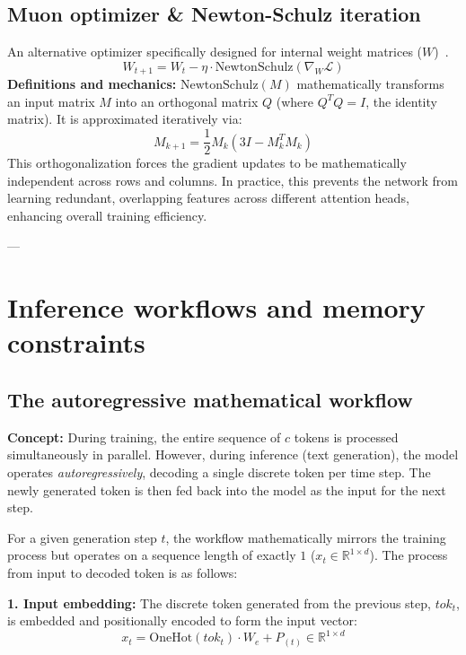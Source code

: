 \documentclass[11pt]{article}
\begin{document}
	\subsection{Muon optimizer \& Newton-Schulz iteration}
	An alternative optimizer specifically designed for internal weight matrices ($W$)~\cite{jordan2024muon}.
	\begin{equation}
		W_{t+1} = W_t - \eta \cdot \text{NewtonSchulz}(\nabla_W \mathcal{L})
	\end{equation}
	\textbf{Definitions and mechanics:} 
	$\text{NewtonSchulz}(M)$ mathematically transforms an input matrix $M$ into an orthogonal matrix $Q$ (where $Q^T Q = I$, the identity matrix).
	It is approximated iteratively via:
	\begin{equation}
		M_{k+1} = \frac{1}{2} M_k (3I - M_k^T M_k)
	\end{equation}
	This orthogonalization forces the gradient updates to be mathematically independent across rows and columns.
	In practice, this prevents the network from learning redundant, overlapping features across different attention heads, enhancing overall training efficiency.
	
	---
	
	\section{Inference workflows and memory constraints}
	
	\subsection{The autoregressive mathematical workflow}
	\textbf{Concept:} During training, the entire sequence of $c$ tokens is processed simultaneously in parallel. However, during inference (text generation), the model operates \textit{autoregressively}, decoding a single discrete token per time step. The newly generated token is then fed back into the model as the input for the next step.
	
	For a given generation step $t$, the workflow mathematically mirrors the training process but operates on a sequence length of exactly $1$ ($x_t \in \mathbb{R}^{1 \times d}$). The process from input to decoded token is as follows:
	
	\textbf{1. Input embedding:} The discrete token generated from the previous step, $tok_t$, is embedded and positionally encoded to form the input vector:
	\begin{equation}
		x_t = \text{OneHot}(tok_t) \cdot W_e + P_{(t)} \in \mathbb{R}^{1 \times d}
	\end{equation}
	
\end{document}
